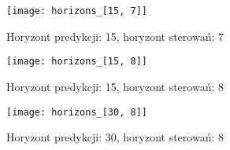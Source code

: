 \begin{figure}[p]
    \centering
	\texttt{[image: horizons\_[15, 7]]}
	\caption{Horyzont predykcji: 15, horyzont sterowań: 7}
	\label{fig:horizons_15_7}
\end{figure}

\begin{figure}[p]
    \centering
	\texttt{[image: horizons\_[15, 8]]}
	\caption{Horyzont predykcji: 15, horyzont sterowań: 8}
	\label{fig:horizons_15_8}
\end{figure}

\begin{figure}[p]
    \centering
	\texttt{[image: horizons\_[30, 8]]}
	\caption{Horyzont predykcji: 30, horyzont sterowań: 8}
	\label{fig:horizons_30_8}
\end{figure}